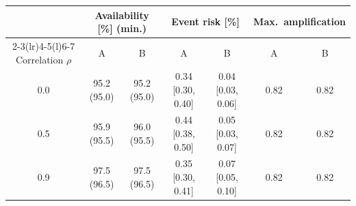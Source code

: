 \begin{tabular}{@{}c c c c c c c@{}}
\toprule
 & \multicolumn{2}{c}{Availability [\%] (min.)} & \multicolumn{2}{c}{Event risk [\%]} & \multicolumn{2}{c}{Max.\ amplification}\\
\cmidrule(lr){2-3}\cmidrule(lr){4-5}\cmidrule(l){6-7}
Correlation $\rho$ & A & B & A & B & A & B\\
\midrule
0.0 & 95.2 (95.0) & 95.2 (95.0) & 0.34 {\scriptsize[0.30, 0.40]} & 0.04 {\scriptsize[0.03, 0.06]} & 0.82 & 0.82\\
0.5 & 95.9 (95.5) & 96.0 (95.5) & 0.44 {\scriptsize[0.38, 0.50]} & 0.05 {\scriptsize[0.03, 0.07]} & 0.82 & 0.82\\
0.9 & 97.5 (96.5) & 97.5 (96.5) & 0.35 {\scriptsize[0.30, 0.41]} & 0.07 {\scriptsize[0.05, 0.10]} & 0.82 & 0.82\\
\bottomrule
\end{tabular}
